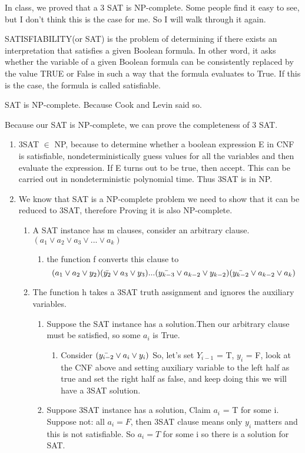 \documentclass{article}
\begin{document}
In class, we proved that a 3 SAT is NP-complete. Some people find it easy to see, but I don't think this is the case for me. So I will walk through it again. 

SATISFIABILITY(or SAT) is the problem of determining if there exists an interpretation that satisfies a given Boolean formula. In other word, it asks whether the variable of a given Boolean formula can be consistently replaced by the value TRUE or False in such a way that the formula evaluates to True. If this is the case, the formula is called satisfiable. 

SAT is NP-complete. Because Cook and Levin said so. 

Because our SAT is NP-complete, we can prove the completeness of 3 SAT. 
\begin{enumerate}
    \item 3SAT $\in$ NP, because to determine whether a boolean expression E in CNF is satisfiable, nondeterministically guess values for all the variables and then evaluate the expression. If E turns out to be true, then accept. This can be carried out in nondeterministic polynomial time. Thus 3SAT is in NP.
    \item We know that SAT is a NP-complete problem we need to show that it can be reduced to 3SAT, therefore Proving it is also NP-complete. 
    \begin{enumerate}
        \item A SAT instance has m clauses, consider an arbitrary clause. 
        $(a_1\vee a_2 \vee a_3 \vee ... \vee a_k)$
        \begin{enumerate}
            \item the function f converts this clause to 
            $$(a_1\vee a_2 \vee y_2)(\Bar{y_2}\vee a_3\vee y_3)...(\Bar{y_{k-3}} \vee a_{k-2} \vee y_{k-2})(\Bar{y_{k-2}}\vee a_{k-2} \vee a_k)$$
        \end{enumerate}
        \item The function h takes a 3SAT truth assignment and ignores the auxiliary variables. 
        \begin{enumerate}
            \item Suppose the SAT instance has a solution.Then our arbitrary clause must be satisfied, so some $a_i$ is True. 
            \begin{enumerate}[-]
                \item Consider $(\Bar{y_{i-2}}\vee a_i \vee y_i)$
                So, let's set $Y_{i-1}$ = T, $y_i$ = F, look at the CNF above and setting auxiliary variable to the left half as true and set the right half as false, and keep doing this we will have a 3SAT solution. 
            \end{enumerate}
            \item Suppose 3SAT instance has a solution, Claim $a_i$ = T for some i. Suppose not: all $a_i=F$, then 3SAT clause means only $y_i$ matters and this is not satisfiable. So $a_i=T$ for some i so there is a solution for SAT. 
        \end{enumerate}
    \end{enumerate}
\end{enumerate}
\end{document}
